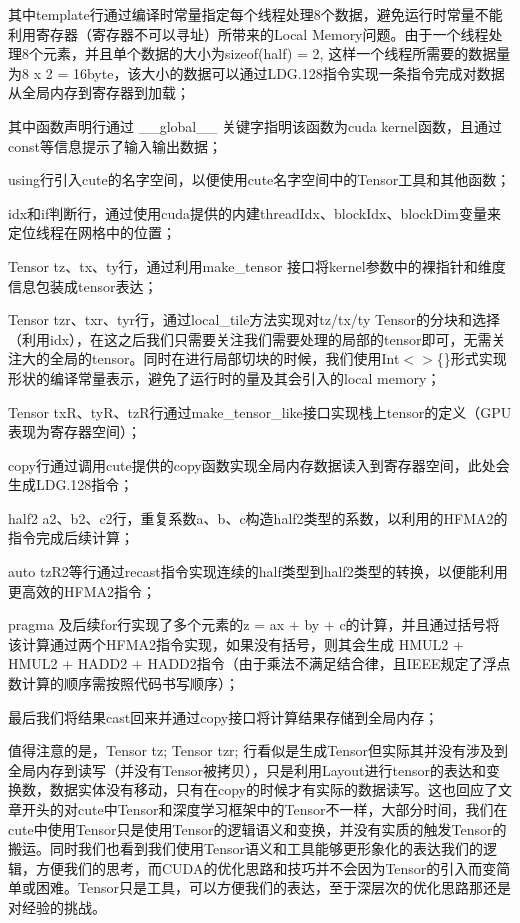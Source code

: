 其中template行通过编译时常量指定每个线程处理8个数据，避免运行时常量不能利用寄存器（寄存器不可以寻址）所带来的Local Memory问题。由于一个线程处理8个元素，并且单个数据的大小为sizeof(half) = 2, 这样一个线程所需要的数据量为8 x 2 = 16byte，该大小的数据可以通过LDG.128指令实现一条指令完成对数据从全局内存到寄存器到加载；

其中函数声明行通过 \_\_global\_\_ 关键字指明该函数为cuda kernel函数，且通过const等信息提示了输入输出数据；

using行引入cute的名字空间，以便使用cute名字空间中的Tensor工具和其他函数；

idx和if判断行，通过使用cuda提供的内建threadIdx、blockIdx、blockDim变量来定位线程在网格中的位置；

Tensor tz、tx、ty行，通过利用make\_tensor 接口将kernel参数中的裸指针和维度信息包装成tensor表达；

Tensor tzr、txr、tyr行，通过local\_tile方法实现对tz/tx/ty Tensor的分块和选择（利用idx），在这之后我们只需要关注我们需要处理的局部的tensor即可，无需关注大的全局的tensor。同时在进行局部切块的时候，我们使用Int$<$$>$\{\}形式实现形状的编译常量表示，避免了运行时的量及其会引入的local memory；

Tensor txR、tyR、tzR行通过make\_tensor\_like接口实现栈上tensor的定义（GPU表现为寄存器空间）；

copy行通过调用cute提供的copy函数实现全局内存数据读入到寄存器空间，此处会生成LDG.128指令；

half2 a2、b2、c2行，重复系数a、b、c构造half2类型的系数，以利用的HFMA2的指令完成后续计算；

auto tzR2等行通过recast指令实现连续的half类型到half2类型的转换，以便能利用更高效的HFMA2指令；

pragma 及后续for行实现了多个元素的z = ax + by + c的计算，并且通过括号将该计算通过两个HFMA2指令实现，如果没有括号，则其会生成 HMUL2 + HMUL2 + HADD2 + HADD2指令（由于乘法不满足结合律，且IEEE规定了浮点数计算的顺序需按照代码书写顺序）；

最后我们将结果cast回来并通过copy接口将计算结果存储到全局内存；

值得注意的是，Tensor tz; Tensor tzr; 行看似是生成Tensor但实际其并没有涉及到全局内存到读写（并没有Tensor被拷贝），只是利用Layout进行tensor的表达和变换数，数据实体没有移动，只有在copy的时候才有实际的数据读写。这也回应了文章开头的对cute中Tensor和深度学习框架中的Tensor不一样，大部分时间，我们在cute中使用Tensor只是使用Tensor的逻辑语义和变换，并没有实质的触发Tensor的搬运。同时我们也看到我们使用Tensor语义和工具能够更形象化的表达我们的逻辑，方便我们的思考，而CUDA的优化思路和技巧并不会因为Tensor的引入而变简单或困难。Tensor只是工具，可以方便我们的表达，至于深层次的优化思路那还是对经验的挑战。

